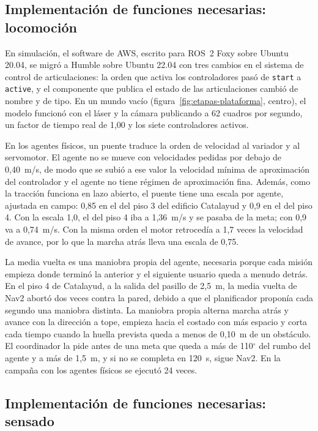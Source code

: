 \subsection{Implementación de funciones necesarias: locomoción}
\label{sec:banda-muerta}
\label{sec:media-vuelta}

En simulación, el software de AWS, escrito para ROS~2 Foxy sobre Ubuntu 20.04, se migró a Humble sobre Ubuntu 22.04 con tres cambios en el sistema de control de articulaciones: la orden que activa los controladores pasó de \texttt{start} a \texttt{active}, y el componente que publica el estado de las articulaciones cambió de nombre y de tipo. En un mundo vacío (figura~\ref{fig:etapas-plataforma}, centro), el modelo funcionó con el láser y la cámara publicando a 62 cuadros por segundo, un factor de tiempo real de 1,00 y los siete controladores activos.

En los agentes físicos, un puente traduce la orden de velocidad al variador y al servomotor. El agente no se mueve con velocidades pedidas por debajo de 0,40~m/s, de modo que se subió a ese valor la velocidad mínima de aproximación del controlador y el agente no tiene régimen de aproximación fina. Además, como la tracción funciona en lazo abierto, el puente tiene una escala por agente, ajustada en campo: 0,85 en el del piso 3 del edificio Catalayud y 0,9 en el del piso 4. Con la escala 1,0, el del piso 4 iba a 1,36~m/s y se pasaba de la meta; con 0,9 va a 0,74~m/s. Con la misma orden el motor retrocedía a 1,7 veces la velocidad de avance, por lo que la marcha atrás lleva una escala de 0,75.

La media vuelta es una maniobra propia del agente, necesaria porque cada misión empieza donde terminó la anterior y el siguiente usuario queda a menudo detrás. En el piso 4 de Catalayud, a la salida del pasillo de 2,5~m, la media vuelta de Nav2 abortó dos veces contra la pared, debido a que el planificador proponía cada segundo una maniobra distinta. La maniobra propia alterna marcha atrás y avance con la dirección a tope, empieza hacia el costado con más espacio y corta cada tiempo cuando la huella prevista queda a menos de 0,10~m de un obstáculo. El coordinador la pide antes de una meta que queda a más de 110$^\circ$ del rumbo del agente y a más de 1,5~m, y si no se completa en 120~s, sigue Nav2. En la campaña con los agentes físicos se ejecutó 24 veces.

\subsection{Implementación de funciones necesarias: sensado}
\label{sec:odometria-laser}
\label{sec:imu}

